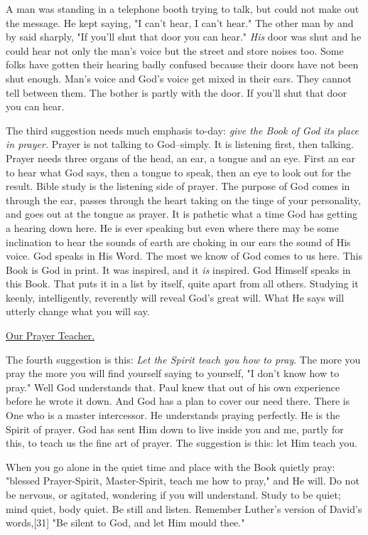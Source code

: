 A man was standing in a telephone booth trying to talk, but could not make
out the message. He kept saying, "I can't hear, I can't hear." The other
man by and by said sharply, "If you'll shut that door you can hear." \textit{His}
door was shut and he could hear not only the man's voice but the street
and store noises too. Some folks have gotten their hearing badly confused
because their doors have not been shut enough. Man's voice and God's voice
get mixed in their ears. They cannot tell between them. The bother is
partly with the door. If you'll shut that door you can hear.

The third suggestion needs much emphasis to-day: \textit{give the Book of God its
place in prayer.} Prayer is not talking to God--simply. It is listening
first, then talking. Prayer needs three organs of the head, an ear, a
tongue and an eye. First an ear to hear what God says, then a tongue to
speak, then an eye to look out for the result. Bible study is the
listening side of prayer. The purpose of God comes in through the ear,
passes through the heart taking on the tinge of your personality, and goes
out at the tongue as prayer. It is pathetic what a time God has getting a
hearing down here. He is ever speaking but even where there may be some
inclination to hear the sounds of earth are choking in our ears the sound
of His voice. God speaks in His Word. The most we know of God comes to us
here. This Book is God in print. It was inspired, and it \textit{is} inspired.
God Himself speaks in this Book. That puts it in a list by itself, quite
apart from all others. Studying it keenly, intelligently, reverently will
reveal God's great will. What He says will utterly change what you will
say.



\underline{Our Prayer Teacher.}


The fourth suggestion is this: \textit{Let the Spirit teach you how to pray}. The
more you pray the more you will find yourself saying to yourself, "I don't
know how to pray." Well God understands that. Paul knew that out of his
own experience before he wrote it down. And God has a plan to cover our
need there. There is One who is a master intercessor. He understands
praying perfectly. He is the Spirit of prayer. God has sent Him down to
live inside you and me, partly for this, to teach us the fine art of
prayer. The suggestion is this: let Him teach you.

When you go alone in the quiet time and place with the Book quietly pray:
"blessed Prayer-Spirit, Master-Spirit, teach me how to pray," and He will.
Do not be nervous, or agitated, wondering if you will understand. Study to
be quiet; mind quiet, body quiet. Be still and listen. Remember Luther's
version of David's words,[31] "Be silent to God, and let Him mould thee."

